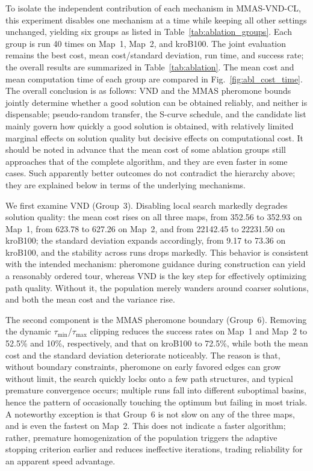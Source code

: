 \documentclass[lettersize,journal]{IEEEtran}
\begin{document}
To isolate the independent contribution of each mechanism in MMAS-VND-CL, this experiment disables one mechanism at a time while keeping all other settings unchanged, yielding six groups as listed in Table~\textcolor{blue}{\ref{tab:ablation_groups}}. Each group is run 40 times on Map~1, Map~2, and kroB100. The joint evaluation remains the best cost, mean cost/standard deviation, run time, and success rate; the overall results are summarized in Table~\textcolor{blue}{\ref{tab:ablation}}. The mean cost and mean computation time of each group are compared in Fig.~\textcolor{blue}{\ref{fig:abl_cost_time}}. The overall conclusion is as follows: VND and the MMAS pheromone bounds jointly determine whether a good solution can be obtained reliably, and neither is dispensable; pseudo-random transfer, the S-curve schedule, and the candidate list mainly govern how quickly a good solution is obtained, with relatively limited marginal effects on solution quality but decisive effects on computational cost. It should be noted in advance that the mean cost of some ablation groups still approaches that of the complete algorithm, and they are even faster in some cases. Such apparently better outcomes do not contradict the hierarchy above; they are explained below in terms of the underlying mechanisms.

We first examine VND (Group~3). Disabling local search markedly degrades solution quality: the mean cost rises on all three maps, from 352.56 to 352.93 on Map~1, from 623.78 to 627.26 on Map~2, and from 22142.45 to 22231.50 on kroB100; the standard deviation expands accordingly, from 9.17 to 73.36 on kroB100, and the stability across runs drops markedly. This behavior is consistent with the intended mechanism: pheromone guidance during construction can yield a reasonably ordered tour, whereas VND is the key step for effectively optimizing path quality. Without it, the population merely wanders around coarser solutions, and both the mean cost and the variance rise.

The second component is the MMAS pheromone boundary (Group~6). Removing the dynamic $\tau_{\min}$/$\tau_{\max}$ clipping reduces the success rates on Map~1 and Map~2 to 52.5\% and 10\%, respectively, and that on kroB100 to 72.5\%, while both the mean cost and the standard deviation deteriorate noticeably. The reason is that, without boundary constraints, pheromone on early favored edges can grow without limit, the search quickly locks onto a few path structures, and typical premature convergence occurs; multiple runs fall into different suboptimal basins, hence the pattern of occasionally touching the optimum but failing in most trials. A noteworthy exception is that Group~6 is not slow on any of the three maps, and is even the fastest on Map~2. This does not indicate a faster algorithm; rather, premature homogenization of the population triggers the adaptive stopping criterion earlier and reduces ineffective iterations, trading reliability for an apparent speed advantage.
\end{document}
